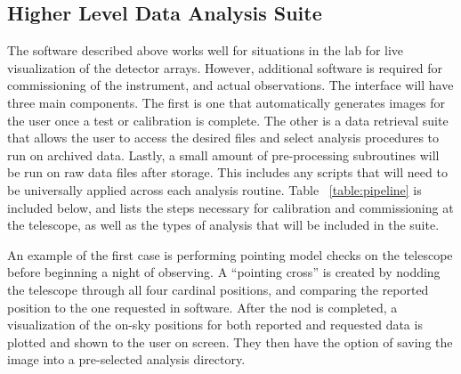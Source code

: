 \documentclass[manuscript]{aastex}
\begin{document}
\subsection{Higher Level Data Analysis Suite}

The software described above works well for situations in the lab for live visualization of the detector arrays. However, additional software is required for commissioning of the instrument, and actual observations. The interface will have three main components. The first is one that automatically generates images for the user once a test or calibration is complete. The other is a data retrieval suite that allows the user to access the desired files and select analysis procedures to run on archived data. Lastly, a small amount of pre-processing subroutines will be run on raw data files after storage. This includes any scripts that will need to be universally applied across each analysis routine. Table ~\ref{table:pipeline} is included below, and lists the steps necessary for calibration and commissioning at the telescope, as well as the types of analysis that will be included in the suite. 

An example of the first case is performing pointing model checks on the telescope before beginning a night of observing. A ``pointing cross'' is created by nodding the telescope through all four cardinal positions, and comparing the reported position to the one requested in software. After the nod is completed, a visualization of the on-sky positions for both reported and requested data is plotted and shown to the user on screen. They then have the option of saving the image into a pre-selected analysis directory. 
\end{document}
